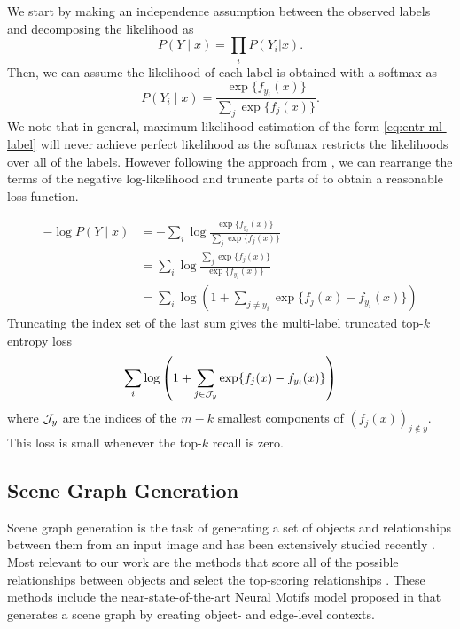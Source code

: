 We start by making an independence assumption between the
observed labels and decomposing the likelihood as
\begin{equation}
  P(Y\mid x)=\prod_i P(Y_i | x).
\end{equation}
Then, we can assume the likelihood of each label is
obtained with a softmax as
\begin{equation}
  \label{eq:entr-ml-label}
  P(Y_i\mid x)=\frac{\exp\{f_{y_i}(x)\}}{\sum_j \exp\{f_j(x)\}}.
\end{equation}
We note that in general, maximum-likelihood estimation
of the form \cref{eq:entr-ml-label} will never achieve
perfect likelihood as the softmax restricts the
likelihoods over all of the labels.
However following the approach from \citet{lapin2016loss},
we can rearrange the terms of the negative log-likelihood
and truncate parts of to obtain a reasonable loss function.

\begin{equation}
  \begin{split}
    -\log P(Y\mid x) &= -\sum_i \log \frac{\exp\{f_{y_i}(x)\}}{\sum_j \exp\{f_j(x)\}} \\
    &= \sum_i \log\frac{\sum_j \exp\{f_j(x)\}}{\exp\{f_{y_i}(x)\}} \\
    &= \sum_i \log \left( 1 + \sum_{j\neq y_i} \exp\{f_j(x)-f_{y_i}(x)\} \right)
  \end{split}
\end{equation}
Truncating the index set of the last sum gives the multi-label
truncated top-$k$ entropy loss
\begin{equation}
  \sum_i \log \left( 1 + \sum_{j\in \mathcal{J}_y} \exp\{f_j(x)-f_{y_i}(x)\} \right)
\end{equation}
where $\mathcal{J}_y$ are the indices of the $m-k$ smallest
components of $\left(f_j(x)\right)_{j\not\in y}$.
This loss is small whenever the top-$k$ recall
is zero.


\subsection{Scene Graph Generation}
\label{sec:lml:rw:sg}

Scene graph generation is the task of generating a set
of objects and relationships between them from an
input image and has been extensively studied recently
\cite{johnson2015image,yang2017support,plummer2017phrase,
  liang2017deep,raposo2017discovering,newell2017pixels,
  xu2017scene,li2018factorizable,
  herzig2018mapping,zellers2018neural,woo2018linknet}.
Most relevant to our work are the methods that score
all of the possible relationships between objects and
select the top-scoring relationships
\cite{xu2017scene,li2018factorizable,herzig2018mapping,woo2018linknet}.
These methods include the near-state-of-the-art
Neural Motifs model proposed in \citet{zellers2018neural}
that generates a scene graph by creating object-
and edge-level contexts.

